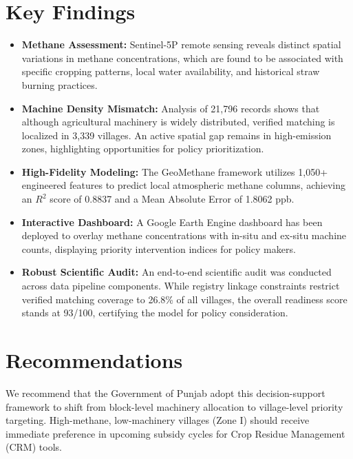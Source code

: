 \documentclass[12pt,a4paper]{report}
\begin{document}
\section*{Key Findings}
\begin{itemize}
    \item \textbf{Methane Assessment:} Sentinel-5P remote sensing reveals distinct spatial variations in methane concentrations, which are found to be associated with specific cropping patterns, local water availability, and historical straw burning practices.
    \item \textbf{Machine Density Mismatch:} Analysis of 21,796 records shows that although agricultural machinery is widely distributed, verified matching is localized in 3,339 villages. An active spatial gap remains in high-emission zones, highlighting opportunities for policy prioritization.
    \item \textbf{High-Fidelity Modeling:} The GeoMethane framework utilizes 1,050+ engineered features to predict local atmospheric methane columns, achieving an $R^2$ score of 0.8837 and a Mean Absolute Error of 1.8062 ppb.
    \item \textbf{Interactive Dashboard:} A Google Earth Engine dashboard has been deployed to overlay methane concentrations with in-situ and ex-situ machine counts, displaying priority intervention indices for policy makers.
    \item \textbf{Robust Scientific Audit:} An end-to-end scientific audit was conducted across data pipeline components. While registry linkage constraints restrict verified matching coverage to 26.8\% of all villages, the overall readiness score stands at 93/100, certifying the model for policy consideration.
\end{itemize}

\section*{Recommendations}
We recommend that the Government of Punjab adopt this decision-support framework to shift from block-level machinery allocation to village-level priority targeting. High-methane, low-machinery villages (Zone I) should receive immediate preference in upcoming subsidy cycles for Crop Residue Management (CRM) tools.

\end{document}
